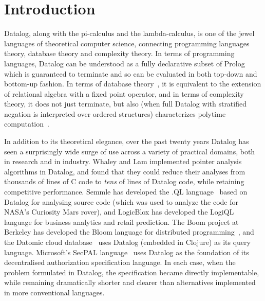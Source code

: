 \section{Introduction}
\label{sec:intro}

Datalog, along with the pi-calculus and the lambda-calculus, is one of
the jewel languages of theoretical computer science, connecting
programming languages theory, database theory and complexity theory.
In terms of programming languages, Datalog can be understood as a
fully declarative subset of Prolog~\cite{datalog-from-prolog} which is
guaranteed to terminate and so can be evaluated in both top-down and
bottom-up fashion. In terms of database theory~\cite{datalog-relalg},
it is equivalent to the extension of relational algebra with a fixed
point operator, and in terms of complexity theory, it does not just
terminate, but also (when full Datalog with stratified negation is
interpreted over ordered structures) characterizes polytime
computation~\cite{datalog-polytime}.

In addition to its theoretical elegance, over the past twenty years
Datalog has seen a surprisingly wide surge of use across a variety of
practical domains, both in research and in industry. Whaley and Lam
\cite{whaley-lam,whaley-phd} implemented pointer analysis algorithms
in Datalog, and found that they could reduce their analyses from
thousands of lines of C code to \emph{tens} of lines of Datalog code,
while retaining competitive performance. Semmle has developed the .QL
language~\cite{semmlecode,ql-inference} based on Datalog for analysing
source code (which was used to analyze the code for NASA's Curiosity
Mars rover), and LogicBlox has developed the LogiQL~\cite{logicblox}
language for business analytics and retail prediction. The Boom
project at Berkeley has developed the Bloom language for distributed
programming~\cite{bloom}, and the Datomic cloud
database~\cite{datomic} uses Datalog (embedded in Clojure) as its
query language. Microsoft's SecPAL language~\cite{secpal} uses Datalog
as the foundation of its decentralised authorization specification
language. In each case, when the problem formulated in Datalog, the
specification became directly implementable, while remaining
dramatically shorter and clearer than alternatives implemented in more
conventional languages.



